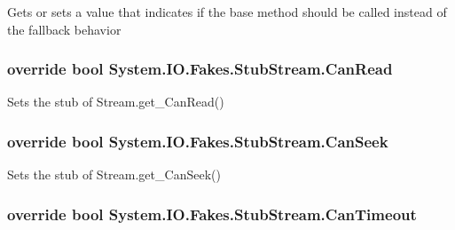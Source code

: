 Gets or sets a value that indicates if the base method should be called instead of the fallback behavior

\hypertarget{class_system_1_1_i_o_1_1_fakes_1_1_stub_stream_a8bf198380caa86ecb871194bd0889de9}{
\subsubsection[{Can\-Read}]{\setlength{\rightskip}{0pt plus 5cm}override bool System.\-I\-O.\-Fakes.\-Stub\-Stream.\-Can\-Read\hspace{0.3cm}{\ttfamily [get]}}}\label{class_system_1_1_i_o_1_1_fakes_1_1_stub_stream_a8bf198380caa86ecb871194bd0889de9}


Sets the stub of Stream.\-get\-\_\-\-Can\-Read()

\hypertarget{class_system_1_1_i_o_1_1_fakes_1_1_stub_stream_a965ed34f7acf89694db1cda04de54154}{
\subsubsection[{Can\-Seek}]{\setlength{\rightskip}{0pt plus 5cm}override bool System.\-I\-O.\-Fakes.\-Stub\-Stream.\-Can\-Seek\hspace{0.3cm}{\ttfamily [get]}}}\label{class_system_1_1_i_o_1_1_fakes_1_1_stub_stream_a965ed34f7acf89694db1cda04de54154}


Sets the stub of Stream.\-get\-\_\-\-Can\-Seek()

\hypertarget{class_system_1_1_i_o_1_1_fakes_1_1_stub_stream_a9904a38fb4a80f5c9716b044ba3a6ec1}{
\subsubsection[{Can\-Timeout}]{\setlength{\rightskip}{0pt plus 5cm}override bool System.\-I\-O.\-Fakes.\-Stub\-Stream.\-Can\-Timeout\hspace{0.3cm}{\ttfamily [get]}}}\label{class_system_1_1_i_o_1_1_fakes_1_1_stub_stream_a9904a38fb4a80f5c9716b044ba3a6ec1}


